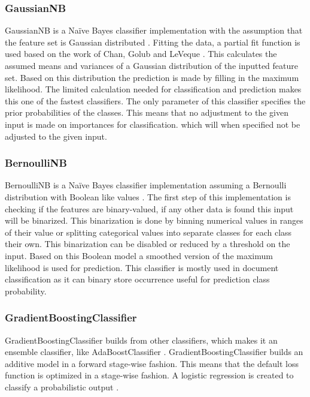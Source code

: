 \documentclass[a4paper,10pt]{article}
\begin{document}
\subsubsection{GaussianNB}
GaussianNB is a Naïve Bayes classifier implementation with the  assumption that the feature set is Gaussian distributed \cite{Bayes}. Fitting the data, a partial fit function is used based on the work of Chan, Golub and LeVeque \cite{Sam-var}. This calculates the assumed means and variances of a Gaussian distribution of the inputted feature set. Based on this distribution the prediction is made by filling in the maximum likelihood. The limited calculation needed for classification and prediction makes this one of the fastest classifiers. The only parameter of this classifier specifies the prior probabilities of the classes. This means that no adjustment to the given input is made on importances for classification. which will when specified not be adjusted to the given input. 

\subsubsection{BernoulliNB}
BernoulliNB is a Naïve Bayes classifier implementation assuming a Bernoulli distribution with Boolean like values \cite{NB-text}. The first step of this implementation is checking if the features are binary-valued, if any other data is found this input will be binarized. This binarization is done by binning numerical values in ranges of their value or splitting categorical values into separate classes for each class their own. This binarization can be disabled or reduced by a threshold on the input. Based on this Boolean model a smoothed version of the maximum likelihood is used for prediction. This classifier is mostly used in document classification as it can binary store occurrence useful for prediction class probability.

\subsubsection{GradientBoostingClassifier}
GradientBoostingClassifier builds from other classifiers, which makes it an ensemble classifier, like AdaBoostClassifier \cite{GradientBoost}. GradientBoostingClassifier builds an additive model in a forward stage-wise fashion. This means that the default loss function is optimized in a stage-wise fashion. A logistic regression is created to classify a probabilistic output \cite{Greedy-GBC}. 
\end{document}
